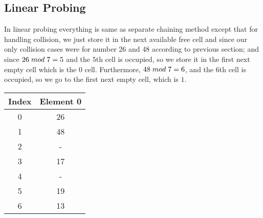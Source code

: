 \documentclass{article}
\begin{document}
\subsection{Linear Probing}

In linear probing everything is same as separate chaining method except that for handling collision, we just store it in the next available free cell and since our only collision cases were for number 26 and 48 according to previous section; and since $26 \hspace{1mm} mod \hspace{1mm} 7 = 5$ and the $5$th cell is occupied, so we store it in the first next empty cell which is the 0 cell. Furthermore, $48 \hspace{1mm} mod \hspace{1mm} 7 = 6$, and the $6$th cell is occupied, so we go to the first next empty cell, which is $1$.

\vspace{10mm}
\begin{center}
 \begin{tabular}{|c | c|} 
 
 \hline
 Index & Element 0 \\ [1ex]
 \hline 
 0 & 26 \\ 

 1 & 48 \\

 2 & - \\

 3 & 17 \\

 4 & - \\

 5 & 19 \\

 6 & 13 \\ [1ex] 
 \hline
\end{tabular}
\end{center}
\vspace{10mm}
\end{document}

